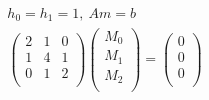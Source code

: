 \documentclass[12pt]{article}
\newenvironment{problem}[2][Problem]{\begin{trivlist}
\item[\hskip \labelsep {\bfseries #1}\hskip \labelsep {\bfseries #2.}]}{\end{trivlist}}
\begin{document}
\begin{problem}{2}
\end{problem}
\begin{gather*}
	h_0 = h_1 = 1,\ Am = b \\
	\left( \begin{array}{ccc}
		2 & 1 & 0 \\
		1 & 4 & 1 \\
		0 & 1 & 2 \\
	\end{array} \right)
	\left( \begin{array}{c}
		M_0 \\
		M_1 \\
		M_2 \\
	\end{array} \right) = 
	\left( \begin{array}{c}
		0 \\
		0 \\
		0 \\
	\end{array} \right)  \\

\end{gather*}
\end{document}
